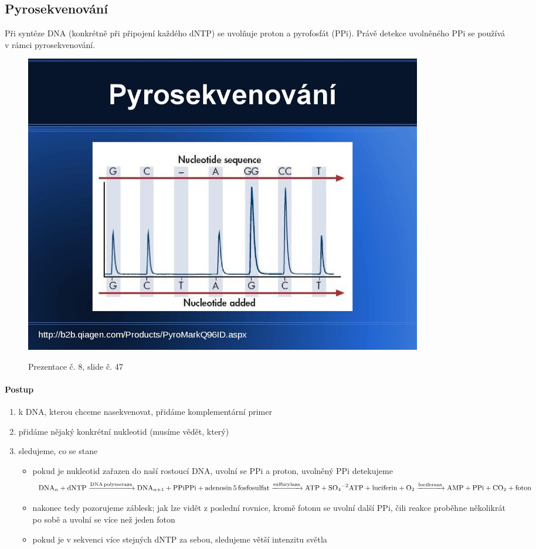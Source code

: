 \documentclass[DIV=8]{scrreprt}
\begin{document}
\subsection{Pyrosekvenování} \label{Pyrosekvenování}


Při syntéze DNA (konkrétně při připojení každého dNTP) se uvolňuje proton a pyrofosfát (PPi). Právě detekce uvolněného PPi se používá v rámci pyrosekvenování.

\begin{figure}
    \caption{Prezentace č. 8, slide č. 47}
    \includegraphics[width=0.85\textwidth]{slides-8/slide-47.jpg}
    \centering
    \label{slides-8-slide-47}
\end{figure}

\paragraph{Postup}
\begin{enumerate}[nosep]
    \item k DNA, kterou chceme nasekvenovat, přidáme komplementární primer
    \item přidáme nějaký konkrétní nukleotid (musíme vědět, který)
    \item sledujeme, co se stane
\begin{itemize}[nosep]
    \item pokud je nukleotid zařazen do naší rostoucí DNA, uvolní se PPi a proton, uvolněný PPi detekujeme
            \[\ce{DNA_n + {dNTP} ->[DNA polymeraza] DNA_{n + 1} + PPi} \\
\ce{PPi + adenosin 5 fosfosulfat ->[sulfurylaza] ATP + SO4^{-2}} \\
\ce{ATP + luciferin + O2 ->[luciferaza] AMP + PPi + CO2 + foton}\]
    \item nakonec tedy pozorujeme záblesk; jak lze vidět z poslední rovnice, kromě fotonu se uvolní další PPi, čili reakce proběhne několikrát po sobě a uvolní se více než jeden foton
    \item pokud je v sekvenci více stejných dNTP za sebou, sledujeme větší intenzitu světla
\end{itemize}

\end{enumerate}
\end{document}
